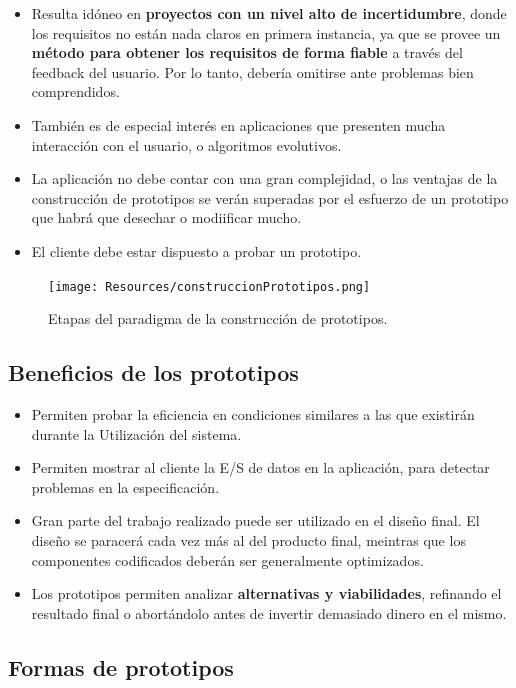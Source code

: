 \begin{itemize}
   \item Resulta idóneo en \textbf{proyectos con un nivel alto de incertidumbre}, donde los requisitos no están nada claros en primera instancia, ya que se provee un \textbf{método para obtener los requisitos de forma fiable} a través del feedback del usuario. Por lo tanto, debería omitirse ante problemas bien comprendidos.
   \item También es de especial interés en aplicaciones que presenten mucha interacción con el usuario, o algoritmos evolutivos.
   \item La aplicación no debe contar con una gran complejidad, o las ventajas de la construcción de prototipos se verán superadas por el esfuerzo de un prototipo que habrá que desechar o modiificar mucho.
   \item El cliente debe estar dispuesto a probar un prototipo.
\end{itemize}

\begin{figure}[H]
   \centering
   \texttt{[image: Resources/construccionPrototipos.png]}
   \caption{Etapas del paradigma de la construcción de prototipos.}
   \label{fig:construccionPrototipos}
\end{figure}

\subsection{Beneficios de los prototipos}

\begin{itemize}
   \item Permiten probar la eficiencia en condiciones similares a las que existirán durante la Utilización del sistema.
   \item Permiten mostrar al cliente la E/S de datos en la aplicación, para detectar problemas en la especificación.
   \item Gran parte del trabajo realizado puede ser utilizado en el diseño final. El diseño se paracerá cada vez más al del producto final, meintras que los componentes codificados deberán ser generalmente optimizados.
   \item Los prototipos permiten analizar \textbf{alternativas y viabilidades}, refinando el resultado final o abortándolo antes de invertir demasiado dinero en el mismo.
\end{itemize}

\subsection{Formas de prototipos}

